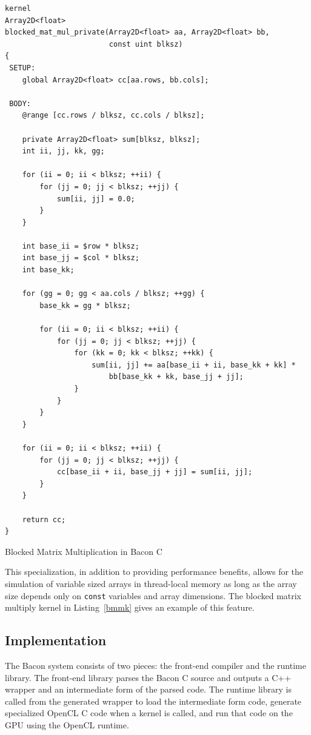 \documentclass{llncs}
\begin{document}
\begin{listing}[t!]
\begin{verbatim}
kernel
Array2D<float>
blocked_mat_mul_private(Array2D<float> aa, Array2D<float> bb, 
                        const uint blksz)
{
 SETUP:
    global Array2D<float> cc[aa.rows, bb.cols];

 BODY:
    @range [cc.rows / blksz, cc.cols / blksz];

    private Array2D<float> sum[blksz, blksz];
    int ii, jj, kk, gg;

    for (ii = 0; ii < blksz; ++ii) {
        for (jj = 0; jj < blksz; ++jj) {
            sum[ii, jj] = 0.0;
        }
    }

    int base_ii = $row * blksz;
    int base_jj = $col * blksz;
    int base_kk;

    for (gg = 0; gg < aa.cols / blksz; ++gg) {
        base_kk = gg * blksz;

        for (ii = 0; ii < blksz; ++ii) {
            for (jj = 0; jj < blksz; ++jj) {
                for (kk = 0; kk < blksz; ++kk) {
                    sum[ii, jj] += aa[base_ii + ii, base_kk + kk] * 
                        bb[base_kk + kk, base_jj + jj];
                }
            }
        }
    }

    for (ii = 0; ii < blksz; ++ii) {
        for (jj = 0; jj < blksz; ++jj) {
            cc[base_ii + ii, base_jj + jj] = sum[ii, jj];
        }
    }

    return cc;
}
\end{verbatim}
\caption{Blocked Matrix Multiplication in Bacon C}\label{bmmk}
\end{listing}
\afterpage{\FloatBarrier}

This specialization, in addition to providing performance benefits,
allows for the simulation of variable sized arrays in thread-local
memory as long as the array size depends only on {\tt const} variables
and array dimensions. The blocked matrix multiply kernel in
Listing~\ref{bmmk} gives an example of this feature.

\subsection{Implementation}

The Bacon system consists of two pieces: the front-end compiler and the
runtime library. The front-end library parses the Bacon C source and
outputs a C++ wrapper and an intermediate form of the parsed code. The
runtime library is called from the generated wrapper to load the
intermediate form code, generate specialized OpenCL C code when a
kernel is called, and run that code on the GPU using the OpenCL
runtime.
\end{document}
